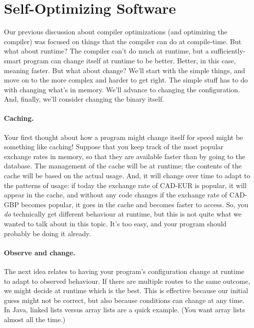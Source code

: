 




\section*{Self-Optimizing Software}
Our previous discussion about compiler optimizations (and optimizing the compiler) was focused on things that the compiler can do at compile-time. But what about runtime? The compiler can't do much at runtime, but a sufficiently-smart program can change itself at runtime to be better. Better, in this case, meaning faster. But what about change? We'll start with the simple things, and move on to the more complex and harder to get right. The simple stuff has to do with changing what's in memory. We'll advance to changing the configuration. And, finally, we'll consider changing the binary itself.

\paragraph{Caching.} Your first thought about how a program might change itself for speed might be something like caching! Suppose that you keep track of the most popular exchange rates in memory, so that they are available faster than by going to the database. The management of the cache will be at runtime; the contents of the cache will be based on the actual usage. And, it will change over time to adapt to the patterns of usage: if today the exchange rate of CAD-EUR is popular, it will appear in the cache, and without any code changes if the exchange rate of CAD-GBP becomes popular, it goes in the cache and becomes faster to access. So, you \textit{do} technically get different behaviour at runtime, but this is not quite what we wanted to talk about in this topic. It's too easy, and your program should probably be doing it already.

\paragraph{Observe and change.}
The next idea relates to having your program's configuration change at runtime to adapt to observed behaviour. If there are multiple routes to the same outcome, we might decide at runtime which is the best. This is effective because our initial guess might not be correct, but also because conditions can change at any time. In Java, linked lists versus array lists are a quick example. (You want array lists almost all the time.)

